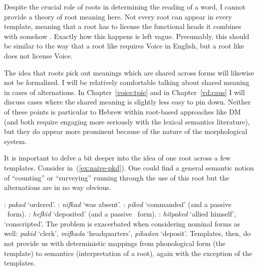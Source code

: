 \begin{exe}
\begin{xlist}
\begin{exe}
\begin{exe}
\begin{exe}
\begin{exe}
\begin{xlist}
\begin{exe}
\begin{xlist}
\begin{xlist}
\begin{xlist}
\begin{exe}
\begin{xlist}
\begin{exe}
\begin{exe}
\begin{xlist}
\begin{exe}
\begin{xlist}
\begin{exe}
\begin{exe}
\begin{xlist}
Despite the crucial role of roots in determining the reading of a word, I cannot provide a theory of root meaning here. Not every root can appear in every template, meaning that a root has to license the functional heads it combines with somehow \citep{harleynoyer00}. Exactly how this happens is left vague. Presumably, this  should be similar to the way that a root like  requires Voice in English, but a root like  does not license Voice.

The idea that roots pick out meanings which are shared across forms will likewise not be formalized. I will be relatively comfortable talking about shared meaning in cases of alternations. In Chapter~\ref{voice:tpie} and in Chapter~\ref{vd:caus} I will discuss cases where the shared meaning is slightly less easy to pin down. Neither of these points is particular to Hebrew within root-based approaches like DM (and both require engaging more seriously with the lexical semantics literature), but they do appear more prominent because of the nature of the morphological system.

It is important to delve a bit deeper into the idea of one root across a few templates. Consider  in~(\ref{ex:naive-pkd}).  One could find a general semantic notion of ``counting'' or ``surveying'' running through the use of this root but the alternations are in no way obvious. 
 \begin{exe}
 \ex \label{ex:naive-pkd} 
 \begin{xlist} 
   \ex  \tkal: \emph{pakad} `ordered'. 
   \ex  \tnif: \emph{nifkad} `was absent'. 
   \ex  \tpie: \emph{piked} `commanded' (and a passive \tpua~form). 
   \ex  \thif: \emph{hefkid} `deposited' (and a passive \thuf~form). 
   \ex  \thit: \emph{hitpaked} `allied himself', `conscripted'. 
 \z
\z 
The problem is exacerbated when considering nominal forms as well: \emph{pakid} `clerk', \emph{mifkada} `headquarters', \emph{pikadon} `deposit'. Templates, then, do not provide us with deterministic mappings from phonological form (the template) to semantics (interpretation of a root), again with the exception of the  templates.


\end{xlist}
\end{exe}
\end{xlist}
\end{exe}
\end{exe}
\end{xlist}
\end{exe}
\end{xlist}
\end{exe}
\end{exe}
\end{xlist}
\end{exe}
\end{xlist}
\end{xlist}
\end{xlist}
\end{exe}
\end{xlist}
\end{exe}
\end{exe}
\end{exe}
\end{exe}
\end{xlist}
\end{exe}
